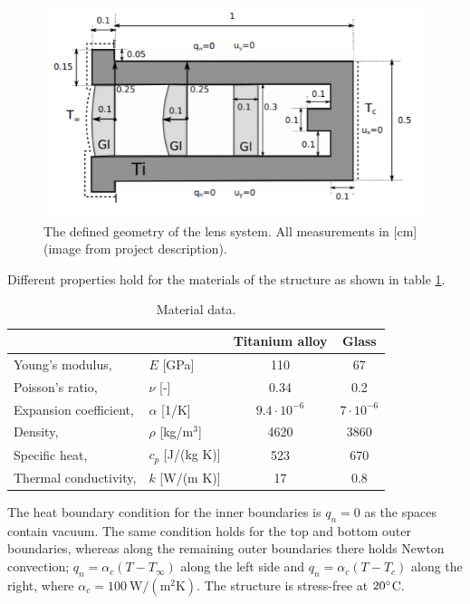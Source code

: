 \documentclass[a4paper,11pt]{article}
\begin{document}
\begin{figure}[H]
    \centering
    \includegraphics{geometri.png}
    \caption{The defined geometry of the lens system. All measurements in [cm] (image from project description).}
    \label{fig:geometry}
\end{figure}
\medskip \noindent Different properties hold for the materials of the structure as shown in table \ref{tab:material}.
\begin{table}[H]
    \centering
    \begin{tabular}{l l|c c}
         & & Titanium alloy & Glass \\ \hline
         Young's modulus, &  $E$ [GPa] & 110 & 67\\
         Poisson's ratio, & $\nu$ [-] & 0.34 & 0.2 \\
         Expansion coefficient, & $\alpha$ [1/K] & $9.4 \cdot 10^{-6}$ & $7\cdot 10^{-6}$\\
         Density, & $\rho$ [kg/m$^3$] & 4620 & 3860 \\
         Specific heat, & $c_p$ [J/(kg K)] & 523 & 670 \\
         Thermal conductivity, & $k$ [W/(m K)] & 17 & 0.8\\ \hline
    \end{tabular}
    \caption{Material data.}
    \label{tab:material}
\end{table}
\noindent The heat boundary condition for the inner boundaries is $q_n = 0$ as the spaces contain vacuum. The same condition holds for the top and bottom outer boundaries, whereas along the remaining outer boundaries there holds Newton convection; $q_n=\alpha_c(T-T_{\infty})$ along the left side and $q_n=\alpha_c(T-T_c)$ along the right, where $\alpha_c=100 \: \text{W}/(\text{m}^2 \text{K})$. The structure is stress-free at $20\degree$C.\\
\end{document}
